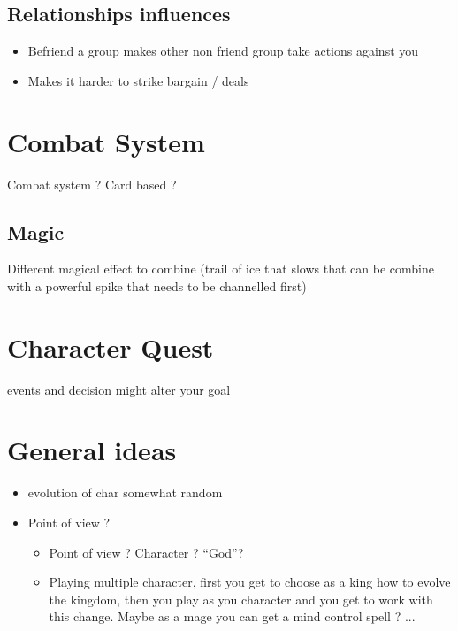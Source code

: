 \documentclass{report}
\begin{document}
		\subsection*{Relationships influences}
    
    	\begin{itemize}
    		\item Befriend a group makes other non friend group take actions against you
    		\item Makes it harder to strike bargain / deals
    	\end{itemize}

    \section{Combat System}

    	Combat system ? Card based ?

    	\subsection*{Magic}

    		Different magical effect to combine (trail of ice that slows that can be combine with a powerful spike that needs to be channelled first)

    \section{Character Quest}

    	events and decision might alter your goal

    \section{General ideas}

    	 \begin{itemize}
    	 	\item evolution of char somewhat random
    	 	\item Point of view ?
    	 	\begin{itemize}
    	 		\item  Point of view ? Character ? ``God''?
    	 		\item Playing multiple character, first you get to choose as a king how to evolve the kingdom, then you play as you character and you get to work with this change. Maybe as a mage you can get a mind control spell ? ...
    	 	\end{itemize}
    	 \end{itemize}
\end{document}
